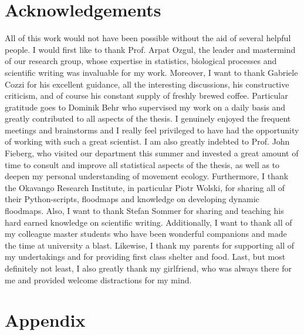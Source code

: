 \documentclass[abstract=on,10pt,a4paper,bibliography=totocnumbered]{scrartcl}
\begin{document}
\section{Acknowledgements}
All of this work would not have been possible without the aid of several helpful
people. I would first like to thank Prof. Arpat Ozgul, the leader and mastermind
of our research group, whose expertise in statistics, biological processes and
scientific writing was invaluable for my work. Moreover, I want to thank
Gabriele Cozzi for his excellent guidance, all the interesting discussions, his
constructive criticism, and of course his constant supply of freshly brewed
coffee. Particular gratitude goes to Dominik Behr who supervised my work on a
daily basis and greatly contributed to all aspects of the thesis. I genuinely
enjoyed the frequent meetings and brainstorms and I really feel privileged to
have had the opportunity of working with such a great scientist. I am also
greatly indebted to Prof. John Fieberg, who visited our department this summer
and invested a great amount of time to consult and improve all statistical
aspects of the thesis, as well as to deepen my personal understanding of
movement ecology. Furthermore, I thank the Okavango Research Institute, in
particular Piotr Wolski, for sharing all of their Python-scripts, floodmaps and
knowledge on developing dynamic floodmaps. Also, I want to thank Stefan Sommer
for sharing and teaching his hard earned knowledge on scientific writing.
Additionally, I want to thank all of my colleague master students who have been
wonderful companions and made the time at university a blast. Likewise, I thank
my parents for supporting all of my undertakings and for providing first class
shelter and food. Last, but most definitely not least, I also greatly thank my
girlfriend, who was always there for me and provided welcome distractions for my
mind.

\newpage
\begingroup
\singlespacing

\endgroup

\newpage
\appendix
\section{Appendix}
\end{document}
